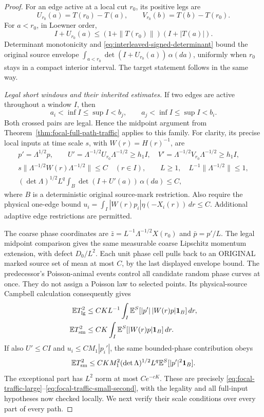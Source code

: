 \documentclass[11pt,reqno]{amsart}
\theoremstyle{definition}
\theoremstyle{remark}
\numberwithin{equation}{section}
\newcommand{\E}{\mathbb E}
\begin{document}
\begin{proof}
For an edge active at a local cut \(r_0\), its positive legs are
\[
 U_{r_0}(a)=T(r_0)-T(a),\qquad
 V_{r_0}(b)=T(b)-T(r_0).
\]
For \(a<r_0\), in Loewner order,
\[
 I+U_{r_0}(a)
 \le(1+\|T(r_0)\|)(I+|T(a)|).
\]
Determinant monotonicity and
\eqref{eq:interleaved-signed-determinant} bound the original source
envelope \(\int_{a<r_0}\det(I+U_{r_0}(a))\,\alpha(da)\), uniformly
when \(r_0\) stays in a compact interior interval. The target
statement follows in the same way.

\emph{Legal short windows and their inherited estimates.}
If two edges are active throughout a window \(I\), then
\[
 a_i<\inf I\le\sup I<b_j,
 \qquad a_j<\inf I\le\sup I<b_i.
\]
Both crossed pairs are legal. Hence the midpoint argument from
Theorem~\ref{thm:focal-full-path-traffic} applies to this family.
For clarity, its precise local inputs at time scale \(s\), with
\(W(r)=H(r)^{-1}\), are
\[
 \begin{gathered}
 p'=\Lambda^{1/2}p,\qquad
 U'=\Lambda^{-1/2}U_{r_0}\Lambda^{-1/2}\ge h_1I,
 \quad V'=\Lambda^{-1/2}V_{r_0}\Lambda^{-1/2}\ge h_1I,\\
 s\|\Lambda^{-1/2}W(r)\Lambda^{-1/2}\|\le C\quad(r\in I),
 \qquad L\ge1,\quad L^{-1}\|\Lambda^{-1/2}\|\le1,\\
 (\det\Lambda)^{1/2}L^q
       \int_B\det(I+U'(a))\,\alpha(da)\le C,
 \end{gathered}
\]
where \(B\) is a deterministic original source-mark restriction.
Also require the physical one-edge bound
\(u_i=\int_I|W(r)p_i|\eta(-X_i(r))\,dr\le C\).
Additional adaptive edge restrictions are permitted.

The coarse phase coordinates are
\(\bar z=L^{-1}\Lambda^{-1/2}X(r_0)\) and \(\bar p=p'/L\).
The legal midpoint comparison gives the same measurable coarse
Lipschitz momentum extension, with defect \(D_0/L^2\). Each unit
phase cell pulls back to an ORIGINAL marked source set of mean at
most \(C\), by the last displayed envelope bound. The predecessor's
Poisson-animal events control all candidate random phase curves at
once. They do not assign a Poisson law to selected points.
Its physical-source Campbell calculation consequently gives
\begin{align}
 \E T_{\rm lg}^2
 &\le CK L^{-1}\int_I\E^S[|p'|\,|W(r)p|\mathbf1_B]\,dr,
 \label{eq:interleaved-window-large}\\
 \E T_{\rm sm}^2
 &\le CK\int_I\E^S[|W(r)p|\mathbf1_B]\,dr.
 \label{eq:interleaved-window-small}
\end{align}
If also \(U'\le CI\) and \(u_i\le C M_1|p_i'|\), the same
bounded-phase contribution obeys
\begin{equation}
\label{eq:interleaved-window-confined}
 \E T_{\rm sm}^2\le CK M_1^2(\det\Lambda)^{1/2}L^q
                                      \E^S[|p'|^2\mathbf1_B].
\end{equation}
The exceptional part has \(L^2\) norm at most \(Ce^{-cK}\).
These are precisely
\eqref{eq:focal-traffic-large}--\eqref{eq:focal-traffic-small-second},
with the legality and all full-input hypotheses now checked locally.
We next verify their scale conditions over every part of every path.


\end{proof}
\end{document}
